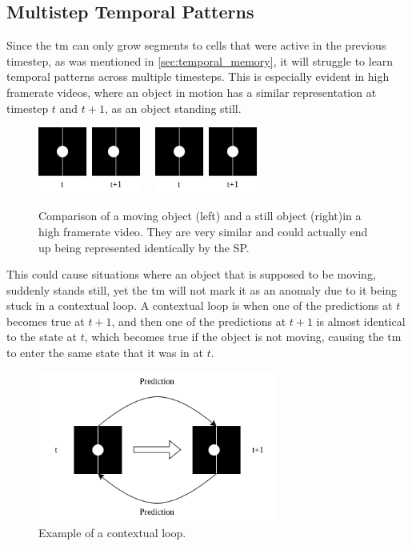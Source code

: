 \subsection{Multistep Temporal Patterns}
\label{sec:multistep_temporal_patterns}
Since the \gls*{tm} can only grow segments to cells that were active in the previous timestep, as was mentioned in \autoref{sec:temporal_memory}, it will struggle to learn temporal patterns across multiple timesteps. This is especially evident in high framerate videos, where an object in motion has a similar representation at timestep $t$ and $t+1$, as an object standing still.
\begin{figure}[H]
    \centering
    \includegraphics[width=0.3\textwidth]{resources/methodology/high_fps_moving.png}
    \unskip\ \vrule\
    \includegraphics[width=0.3\textwidth]{resources/methodology/high_fps_still.png}
    \caption{Comparison of a moving object (left) and a still object (right)in a high framerate video. They are very similar and could actually end up being represented identically by the SP.}
\end{figure}
This could cause situations where an object that is supposed to be moving, suddenly stands still, yet the \gls*{tm} will not mark it as an anomaly due to it being stuck in a contextual loop. A contextual loop is when one of the predictions at $t$ becomes true at $t+1$, and then one of the predictions at $t+1$ is almost identical to the state at $t$, which becomes true if the object is not moving, causing the \gls*{tm} to enter the same state that it was in at $t$.
\begin{figure}[H]
    \centering
    \includegraphics[width=0.7\textwidth]{resources/methodology/contextual_loop.png}
    \caption{Example of a contextual loop.}
\end{figure}
